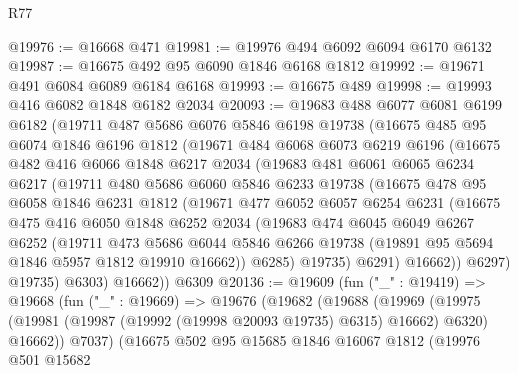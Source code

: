 \begin{lexlean}{R77}
\begin{coremodule}
@19976 := @16668 @471
@19981 := @19976 @494 @6092 @6094 @6170 @6132
@19987 := @16675 @492 @95 @6090 @1846 @6168 @1812
@19992 := @19671 @491 @6084 @6089 @6184 @6168
@19993 := @16675 @489
@19998 := @19993 @416 @6082 @1848 @6182 @2034
@20093 := @19683
    @488
    @6077
    @6081
    @6199
    @6182
    (@19711
      @487
      @5686
      @6076
      @5846
      @6198
      @19738
      (@16675
        @485
        @95
        @6074
        @1846
        @6196
        @1812
        (@19671
          @484
          @6068
          @6073
          @6219
          @6196
          (@16675
            @482
            @416
            @6066
            @1848
            @6217
            @2034
            (@19683
              @481
              @6061
              @6065
              @6234
              @6217
              (@19711
                @480
                @5686
                @6060
                @5846
                @6233
                @19738
                (@16675
                  @478
                  @95
                  @6058
                  @1846
                  @6231
                  @1812
                  (@19671
                    @477
                    @6052
                    @6057
                    @6254
                    @6231
                    (@16675
                      @475
                      @416
                      @6050
                      @1848
                      @6252
                      @2034
                      (@19683
                        @474
                        @6045
                        @6049
                        @6267
                        @6252
                        (@19711
                          @473
                          @5686
                          @6044
                          @5846
                          @6266
                          @19738
                          (@19891 @95 @5694 @1846 @5957 @1812 @19910 @16662))
                        @6285)
                      @19735)
                    @6291)
                  @16662))
              @6297)
            @19735)
          @6303)
        @16662))
    @6309
@20136 := @19609
    (fun ("_" : @19419) =>
    @19668
      (fun ("_" : @19669) =>
      @19676
        (@19682
          (@19688
            (@19969
              (@19975 (@19981 (@19987 (@19992 (@19998 @20093 @19735) @6315) @16662) @6320) @16662))
            @7037)
          (@16675
            @502
            @95
            @15685
            @1846
            @16067
            @1812
            (@19976
              @501
              @15682

\end{coremodule}
\end{lexlean}
